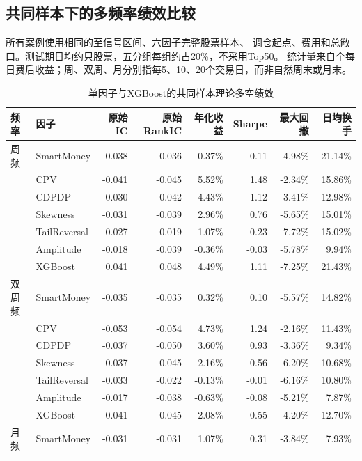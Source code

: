 \documentclass[UTF8,zihao=-4,fontset=fandol]{ctexart}
\renewcommand{\arraystretch}{1.28}
\begin{document}
\clearpage
\subsection{共同样本下的多频率绩效比较}
所有案例使用相同的\ComparisonStart 至\ComparisonEnd 信号区间、六因子完整股票样本、
调仓起点、费用和总敞口。测试期日均约\CommonMeanStocks 只股票，五分组每组约占20\%，不采用Top50。
统计量来自\ReturnDays 个每日费后收益；周、双周、月分别指每5、10、20个交易日，而非自然周末或月末。

\begin{table}[H]\centering\small
\caption{单因子与XGBoost的共同样本理论多空绩效}
\setlength{\tabcolsep}{4pt}\renewcommand{\arraystretch}{1.22}
\begin{tabular}{llrrrrrr}\toprule
频率 & 因子 & 原始IC & 原始RankIC & 年化收益 & Sharpe & 最大回撤 & 日均换手\\\midrule
周频 & SmartMoney & -0.038 & -0.036 & 0.37\% & 0.11 & -4.98\% & 21.14\% \\
 & CPV & -0.041 & -0.045 & 5.52\% & 1.48 & -2.34\% & 15.86\% \\
 & CDPDP & -0.030 & -0.042 & 4.43\% & 1.12 & -3.41\% & 12.98\% \\
 & Skewness & -0.031 & -0.039 & 2.96\% & 0.76 & -5.65\% & 15.01\% \\
 & TailReversal & -0.027 & -0.019 & -1.07\% & -0.23 & -7.72\% & 15.02\% \\
 & Amplitude & -0.018 & -0.039 & -0.36\% & -0.03 & -5.78\% & 9.94\% \\
\rowcolor{blue!8}
 & XGBoost & 0.041 & 0.048 & 4.49\% & 1.11 & -7.25\% & 21.43\% \\
\midrule
双周频 & SmartMoney & -0.035 & -0.035 & 0.32\% & 0.10 & -5.57\% & 14.82\% \\
 & CPV & -0.053 & -0.054 & 4.73\% & 1.24 & -2.16\% & 11.43\% \\
 & CDPDP & -0.037 & -0.050 & 3.60\% & 0.93 & -3.36\% & 9.34\% \\
 & Skewness & -0.037 & -0.045 & 2.16\% & 0.56 & -6.20\% & 10.68\% \\
 & TailReversal & -0.033 & -0.022 & -0.13\% & -0.01 & -6.16\% & 10.80\% \\
 & Amplitude & -0.017 & -0.038 & -0.63\% & -0.08 & -5.21\% & 7.87\% \\
\rowcolor{blue!8}
 & XGBoost & 0.041 & 0.045 & 2.08\% & 0.55 & -4.20\% & 12.70\% \\
\midrule
月频 & SmartMoney & -0.031 & -0.031 & 1.07\% & 0.31 & -3.84\% & 7.93\% \\

\end{tabular}
\end{table}
\end{document}
